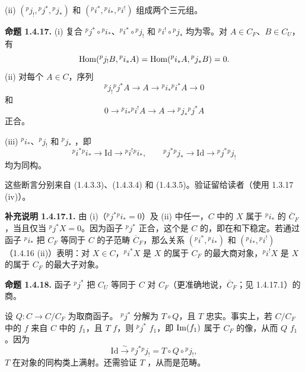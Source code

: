 (ii) $({}^pj_!,{}^pj^*,{}^pj_*)$ 和 $({}^pi^*,{}^pi_*,{}^pi^!)$ 组成两个三元组。

\par\medskip\noindent\textbf{命题 1.4.17.}
(i) 复合 ${}^pj^*\circ{}^pi_*$、${}^pi^*\circ{}^pj_!$ 和 ${}^pi^!\circ{}^pj_*$ 均为零。对 $A\in C_F$、$B\in C_U$，有
\[
\operatorname{Hom}({}^pj_!B,{}^pi_*A)=\operatorname{Hom}({}^pi_*A,{}^pj_*B)=0.
\]
(ii) 对每个 $A\in C$，序列
\[
{}^pj_!{}^pj^*A\longrightarrow A\longrightarrow{}^pi_*{}^pi^*A\longrightarrow0
\]
和
\[
0\longrightarrow{}^pi_*{}^pi^!A\longrightarrow A\longrightarrow{}^pj_*{}^pj^*A
\]
正合。

(iii) ${}^pi_*$、${}^pj_!$ 和 ${}^pj_*$ ，即
\[
{}^pi^*{}^pi_*\longrightarrow\mathrm{Id}\longrightarrow{}^pi^!{}^pi_*,
\qquad{}^pj^*{}^pj_*\longrightarrow\mathrm{Id}\longrightarrow{}^pj^*{}^pj_!
\]
均为同构。

这些断言分别来自 (1.4.3.3)、(1.4.3.4) 和 (1.4.3.5)。验证留给读者（使用 1.3.17 (iv)）。

\par\medskip\noindent\textbf{补充说明 1.4.17.1.}
由 (i)（${}^pj^*{}^pi_*=0$）及 (ii) 中任一，$C$ 中的 $X$ 属于 ${}^pi_*$ 的 $\overline C_F$，当且仅当 ${}^pj^*X=0$。因为函子 ${}^pj^*$ 正合，这个是 $C$ 的，即在和下稳定。若通过函子 ${}^pi_*$ 把 $C_F$ 等同于 $C$ 的子范畴 $\overline C_F$，那么关系 $({}^pi^*,{}^pi_*)$ 和 $({}^pi_*,{}^pi^!)$（1.4.16 (ii)）表明：对 $X\in C$，${}^pi^*X$ 是 $X$ 的属于 $C_F$ 的最大商对象，${}^pi^!X$ 是 $X$ 的属于 $C_F$ 的最大子对象。

\par\medskip\noindent\textbf{命题 1.4.18.}
函子 ${}^pj^*$ 把 $C_U$ 等同于 $C$ 对 $C_F$（更准确地说，$\overline C_F$；见 1.4.17.1）的商。

设 $Q:C\to C/C_F$ 为取商函子。 ${}^pj^*$ 分解为 $T\circ Q$，且 $T$ 忠实。事实上，若 $C/C_F$ 中的 $f$ 来自 $C$ 中的 $f_1$，且 $T$  $f$，则 ${}^pj^*$  $f_1$，即 $\operatorname{Im}(f_1)$ 属于 $C_F$ 的像，从而 $Q$  $f_1$。因为
\[
\mathrm{Id}\xrightarrow{\sim}{}^pj^*{}^pj_!=T\circ Q\circ{}^pj_!,
\]
$T$ 在对象的同构类上满射。还需验证 $T$ ，从而是范畴。

